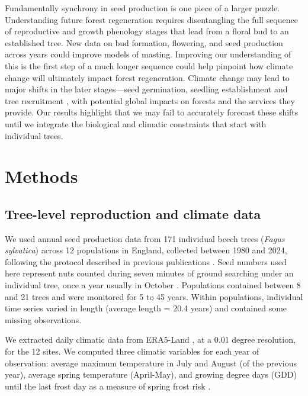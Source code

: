 \documentclass[11pt]{article}
\begin{document}
Fundamentally synchrony in seed production is one piece of a larger puzzle. Understanding future forest regeneration requires disentangling the full sequence of reproductive and growth phenology stages that lead from a floral bud to an established tree. New data on bud formation, flowering, and seed production across years could improve models of masting. Improving our understanding of this is the first step of a much longer sequence could help pinpoint how climate change will ultimately impact forest regeneration. Climate change may lead to major shifts in the later stages---seed germination, seedling establishment and tree recruitment \citep{Petrie2023}, with potential global impacts on forests and the services they provide. Our results highlight that we may fail to accurately forecast these shifts until we integrate the biological and climatic constraints that start with individual trees. 

\section*{Methods} 

\subsection*{Tree-level reproduction and climate data}

We used annual seed production data from 171 individual beech trees (\emph{Fagus sylvatica}) across 12 populations in England, collected between 1980 and 2024, following the protocol described in previous publications \citep{Hilton1986, Packham2008, Bogdziewicz2021,HacketPain2025}. Seed numbers used here represent nuts counted during seven minutes of ground searching under an individual tree, once a year usually in October \citep{Hilton1986, Packham2008}. Populations contained between 8 and 21 trees and were monitored for 5 to 45 years. Within populations, individual time series varied in length (average length = 20.4 years) and contained some missing observations.

We extracted daily climatic data from ERA5-Land \citep{MunozSabater2021}, at a 0.01 degree resolution, for the 12 sites. We computed three climatic variables for each year of observation: average maximum temperature in July and August (of the previous year), average spring temperature (April-May), and growing degree days (GDD) until the last frost day as a measure of spring frost risk \citep{Vitasse2018}.
\end{document}
